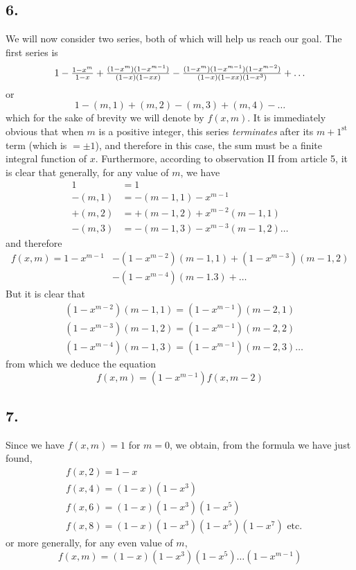 \documentclass[twoside,12pt]{memoir}
\let\oldfrac\frac
\def\frac#1#2{\mathchoice{\tfrac{#1}{#2}}{\oldfrac{#1}{#2}}{\genfrac{}{}{}{2}{#1}{#2\mathstrut}}{\genfrac{}{}{}{3}{#1}{#2\mathstrut}}}
\begin{document}
\subsection*{6.}

We will now consider two series, both of which will help us reach our goal. The first series is
\[1-\frac{1-x^{m}}{1-x}+\frac{(1-x^{m})(1-x^{m-1})}{(1-x)(1-xx)}-\frac{(1-x^{m})(1-x^{m-1})(1-x^{m-2})}{(1-x)(1-xx)(1-x^{3})}+\ldots\]
or
\[1-(m, 1)+(m, 2)-(m, 3)+(m, 4)-\ldots\]
which for the sake of brevity we will denote by \(f(x, m)\). It is immediately obvious that when \(m\) is a positive integer, this series \textit{terminates} after its \({m+1}^{\text{st }}\) term (which is \(= \pm 1\)), and therefore in this case, the sum must be a finite integral function of \(x\). Furthermore, according to observation II from article 5, it is clear that generally, for any value of \(m\), we have
\[\begin{aligned}
1 & =1 \\
-(m, 1) & =-(m-1,1)-x^{m-1} \\
+(m, 2) & =+(m-1,2)+x^{m-2}(m-1,1) \\
-(m, 3) & =-(m-1,3)-x^{m-3}(m-1,2) \ldots
\end{aligned}\]
and therefore
\[\begin{aligned}
f(x, m)=1-x^{m-1}&-(1-x^{m-2})(m-1,1)+(1-x^{m-3})(m-1,2) \\
&-(1-x^{m-4})(m-1.3)+\ldots
\end{aligned}\]
But it is clear that
\[\begin{aligned}
& (1-x^{m-2})(m-1,1)=(1-x^{m-1})(m-2,1) \\
& (1-x^{m-3})(m-1,2)=(1-x^{m-1})(m-2,2) \\
& (1-x^{m-4})(m-1,3)=(1-x^{m-1})(m-2,3) \ldots
\end{aligned}\]
from which we deduce the equation
\[f(x, m)=(1-x^{m-1}) f(x, m-2) \tag{1}\]
%

\subsection*{7.}
 
Since we have \(f(x, m)=1\) for \(m=0\), we obtain, from the formula we have just found,
\[\begin{aligned}
& f(x, 2)=1-x \\
& f(x, 4)=(1-x)(1-x^{3}) \\
& f(x, 6)=(1-x)(1-x^{3})(1-x^{5}) \\
& f(x, 8)=(1-x)(1-x^{3})(1-x^{5})(1-x^{7}) \text{ etc{.}}
\end{aligned}\]
or more generally, for any even value of \(m\),
\[f(x, m)=(1-x)(1-x^{3})(1-x^{5}) \ldots (1-x^{m-1}) \tag{2}\] 
%
\end{document}
